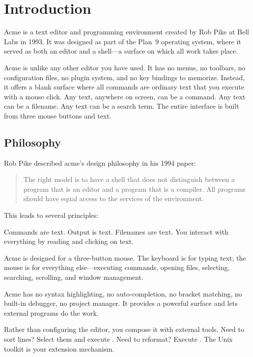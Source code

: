 \chapter{Introduction}
\label{ch:intro}


Acme is a text editor and programming environment created by Rob Pike
at Bell Labs in 1993.  It was designed as part of the Plan~9 operating
system, where it served as both an editor and a shell---a surface on
which all work takes place.

Acme is unlike any other editor you have used.  It has no menus, no
toolbars, no configuration files, no plugin system, and no key bindings
to memorize.  Instead, it offers a blank surface where all commands are
ordinary text that you execute with a mouse click.  Any text, anywhere
on screen, can be a command.  Any text can be a filename.  Any text can
be a search term.  The entire interface is built from three mouse
buttons and text.

\section{Philosophy}

Rob Pike described acme's design philosophy in his 1994 paper:

\begin{quote}
The right model is to have a shell that does not distinguish between a
program that is an editor and a program that is a compiler.  All programs
should have equal access to the services of the environment.
\end{quote}

This leads to several principles:

\begin{description}[style=nextline]
\item[Text is the universal interface.]
Commands are text.  Output is text.  Filenames are text.  You interact
with everything by reading and clicking on text.

\item[The mouse is primary.]
Acme is designed for a three-button mouse.  The keyboard is for typing
text; the mouse is for everything else---executing commands, opening
files, selecting, searching, scrolling, and window management.

\item[Simplicity over features.]
Acme has no syntax highlighting, no auto-completion, no bracket matching,
no built-in debugger, no project manager.  It provides a powerful surface
and lets external programs do the work.

\item[Compose, don't configure.]
Rather than configuring the editor, you compose it with external tools.
Need to sort lines?  Select them and execute .  Need to
reformat?  Execute .  The Unix toolkit is your extension
mechanism.
\end{description}


